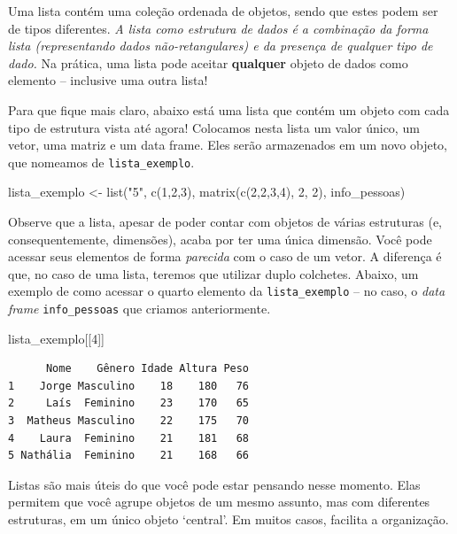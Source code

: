 \documentclass[
  letterpaper,
  DIV=11,
  numbers=noendperiod]{scrreprt}
\newenvironment{Shaded}{\begin{snugshade}}{\end{snugshade}}
\newcommand{\DecValTok}[1]{\textcolor[rgb]{0.68,0.00,0.00}{#1}}
\newcommand{\FunctionTok}[1]{\textcolor[rgb]{0.28,0.35,0.67}{#1}}
\newcommand{\NormalTok}[1]{\textcolor[rgb]{0.00,0.23,0.31}{#1}}
\newcommand{\OtherTok}[1]{\textcolor[rgb]{0.00,0.23,0.31}{#1}}
\newcommand{\StringTok}[1]{\textcolor[rgb]{0.13,0.47,0.30}{#1}}
\begin{document}
Uma lista contém uma coleção ordenada de objetos, sendo que estes podem
ser de tipos diferentes. \emph{A lista como estrutura de dados é a
combinação da forma lista (representando dados não-retangulares) e da
presença de qualquer tipo de dado.} Na prática, uma lista pode aceitar
\textbf{qualquer} objeto de dados como elemento -- inclusive uma outra
lista!

Para que fique mais claro, abaixo está uma lista que contém um objeto
com cada tipo de estrutura vista até agora! Colocamos nesta lista um
valor único, um vetor, uma matriz e um data frame. Eles serão
armazenados em um novo objeto, que nomeamos de \texttt{lista\_exemplo}.

\begin{Shaded}
\begin{Highlighting}[]
\NormalTok{lista\_exemplo }\OtherTok{\textless{}{-}} \FunctionTok{list}\NormalTok{(}\StringTok{"5"}\NormalTok{, }\FunctionTok{c}\NormalTok{(}\DecValTok{1}\NormalTok{,}\DecValTok{2}\NormalTok{,}\DecValTok{3}\NormalTok{), }\FunctionTok{matrix}\NormalTok{(}\FunctionTok{c}\NormalTok{(}\DecValTok{2}\NormalTok{,}\DecValTok{2}\NormalTok{,}\DecValTok{3}\NormalTok{,}\DecValTok{4}\NormalTok{), }\DecValTok{2}\NormalTok{, }\DecValTok{2}\NormalTok{), info\_pessoas)}
\end{Highlighting}
\end{Shaded}

Observe que a lista, apesar de poder contar com objetos de várias
estruturas (e, consequentemente, dimensões), acaba por ter uma única
dimensão. Você pode acessar seus elementos de forma \emph{parecida} com
o caso de um vetor. A diferença é que, no caso de uma lista, teremos que
utilizar duplo colchetes. Abaixo, um exemplo de como acessar o quarto
elemento da \texttt{lista\_exemplo} -- no caso, o \emph{data frame}
\texttt{info\_pessoas} que criamos anteriormente.

\begin{Shaded}
\begin{Highlighting}[]
\NormalTok{lista\_exemplo[[}\DecValTok{4}\NormalTok{]]}
\end{Highlighting}
\end{Shaded}

\begin{verbatim}
      Nome    Gênero Idade Altura Peso
1    Jorge Masculino    18    180   76
2     Laís  Feminino    23    170   65
3  Matheus Masculino    22    175   70
4    Laura  Feminino    21    181   68
5 Nathália  Feminino    21    168   66
\end{verbatim}

Listas são mais úteis do que você pode estar pensando nesse momento.
Elas permitem que você agrupe objetos de um mesmo assunto, mas com
diferentes estruturas, em um único objeto `central'. Em muitos casos,
facilita a organização.
\end{document}

